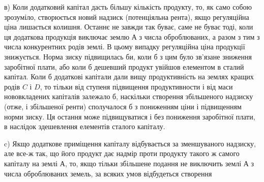 в) Коли додатковий капітал дасть більшу кількість продукту, то, як само
собою зрозуміло, створюється новий надзиск (потенціяльна рента), якщо регуляційна
ціна лишається колишня. Останнє не завжди так буває, саме не буває
тоді, коли ця додаткова продукція виключає землю $А$ з числа оброблюваних, а
разом з тим з числа конкурентних родів землі. В цьому випадку регуляційна ціна
продукції знижується. Норма зиску підвищилась би, коли б з цим було зв’язане
зниження заробітної плати, або коли б дешевший продукт увійшов елементом
в сталий капітал. Коли б додаткові капітали дали вищу продуктивність на
землях кращих родів $C$ і $D$, то тільки від ступеня підвищення продуктивности
і від маси нововкладених капіталів залежало б, наскільки створення збільшеного
надзиску (отже, і збільшеної ренти) сполучалося б з пониженням ціни і підвищенням
норми зиску. Ця остання може підвищуватися і без пониження заробітної
плати, в наслідок здешевлення елементів сталого капіталу.

c) Якщо додаткове приміщення капіталу відбувається за зменшуваного
надзиску, але все-ж так, що його продукт дає надмір проти продукту такого ж
самого капіталу на землі $А$, то, якщо тільки збільшене подання не виключить
землі $А$ з числа оброблюваних земель, за всяких умов відбудеться створення
\parbreak{}  %
